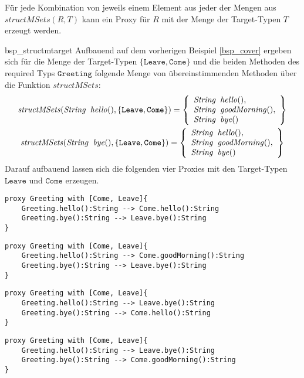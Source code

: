 \noindent
Für jede Kombination von jeweils einem Element aus jeder der Mengen aus $\mathit{structMSets(R,T)}$ kann ein Proxy für $R$ mit der Menge der Target-Typen $T$ erzeugt werden.

\begin{example}{bsp_structmtarget}
Aufbauend auf dem vorherigen Beispiel \ref{bsp_cover} ergeben sich für die Menge der Target-Typen  $\{\texttt{Leave}, \texttt{Come}\}$ und die beiden Methoden des required Typs $\texttt{Greeting}$ folgende Menge von übereinstimmenden Methoden über die Funktion $\mathit{structMSets}$:
\begin{gather*}
\mathit{structMSets(\mathit{String}\texttt{ }\mathit{hello()},\{\texttt{Leave}, \texttt{Come}\})} = 
\left\{
\begin{array}{l}
\mathit{String}\texttt{ }\mathit{hello()},\\
\mathit{String}\texttt{ }\mathit{goodMorning()},\\
\mathit{String}\texttt{ }\mathit{bye()}
\end{array}
\right\}\\
\mathit{structMSets(\mathit{String}\texttt{ }\mathit{bye()},\{\texttt{Leave}, \texttt{Come}\})} = 
\left\{
\begin{array}{l}
\mathit{String}\texttt{ }\mathit{hello()},\\
\mathit{String}\texttt{ }\mathit{goodMorning()},\\
\mathit{String}\texttt{ }\mathit{bye()}
\end{array}
\right\}
\end{gather*}
\noindent
Darauf aufbauend lassen sich die folgenden vier Proxies mit den Target-Typen $\texttt{Leave}$ und $\texttt{Come}$ erzeugen.
\begin{lstlisting}[style = dsl]
proxy Greeting with [Come, Leave]{
	Greeting.hello():String --> Come.hello():String
	Greeting.bye():String --> Leave.bye():String
}
\end{lstlisting}
\begin{lstlisting}[style = dsl]
proxy Greeting with [Come, Leave]{
	Greeting.hello():String --> Come.goodMorning():String
	Greeting.bye():String --> Leave.bye():String
}
\end{lstlisting}
\begin{lstlisting}[style = dsl]
proxy Greeting with [Come, Leave]{
	Greeting.hello():String --> Leave.bye():String
	Greeting.bye():String --> Come.hello():String
}
\end{lstlisting}
\begin{lstlisting}[style = dsl]
proxy Greeting with [Come, Leave]{
	Greeting.hello():String --> Leave.bye():String
	Greeting.bye():String --> Come.goodMorning():String
}
\end{lstlisting}
\end{example}
